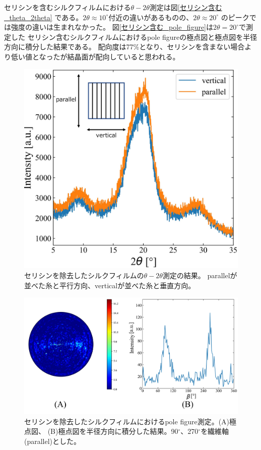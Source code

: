 \documentclass[dvipdfmx,12pt,a4paper]{jreport}
\begin{document}
			セリシンを含むシルクフィルムにおける$\theta -2\theta$測定は図\ref{セリシン含む_theta_2theta}
			である。$2\theta \approx 10^{\circ}$付近の違いがあるものの、$2\theta \approx 20^{\circ}$
			のピークでは強度の違いは生まれなかった。
			図\ref{セリシン含む_pole_figure}は$2\theta = 20^{\circ}$で測定した
			セリシン含むシルクフィルムにおけるpole figureの極点図と極点図を半径方向に積分した結果である。
			配向度は77\%となり、セリシンを含まない場合より低い値となったが結晶面が配向していると思われる。
			\begin{figure}[H]
				\centering
				\includegraphics[scale=0.65]{theta_2theta_fibroin_film}
				\caption{セリシンを除去したシルクフィルムの$\theta - 2\theta$測定の結果。
				parallelが並べた糸と平行方向、verticalが並べた糸と垂直方向。}
				\label{theta_2theta_fibroin_film}
			\end{figure}
			\begin{figure}[h]
				\centering
				\includegraphics[width=\linewidth]{pole_figure_silk_fibroin.jpg}
				\caption{セリシンを除去したシルクフィルムにおけるpole figure測定。(A)極点図、
				(B)極点図を半径方向に積分した結果。90$^{\circ}$、270$^{\circ}$を繊維軸(parallel)とした。}
				\label{極点図_結果_without_sericin}
			\end{figure}
\end{document}

